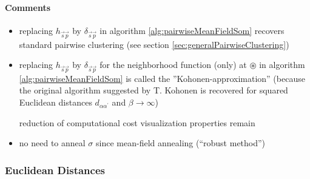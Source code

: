 \paragraph{Comments} \label{sec:comments}
\begin{itemize}
\item replacing $h_{\vec{s} \vec{p}}$ by $\delta_{\vec{s} \vec{p}}$ in algorithm 
\ref{alg:pairwiseMeanFieldSom} recovers standard pairwise clustering (see section
  \ref{sec:generalPairwiseClustering})
\item replacing $h_{\vec{s} \vec{p}}$ by $\delta_{\vec{s} \vec{p}}$
  for the neighborhood function (only) at $\circledast$ in algorithm 
\ref{alg:pairwiseMeanFieldSom} is called
  the ''Kohonen-approximation'' (because the original algorithm
  suggested by T. Kohonen is recovered for squared Euclidean distances
  $d_{\alpha \alpha^{'}}$ and $\beta \rightarrow \infty$)
		\begin{itemize}
			\itr reduction of computational cost
			\itr visualization properties remain
		\end{itemize}
\item no need to anneal $\sigma$ since mean-field annealing (``robust method'')
\end{itemize}


\subsubsection{Euclidean Distances}

